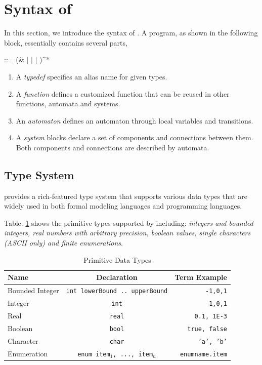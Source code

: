 \section{Syntax of \lang{}}
\label{sec:syntax}

In this section, we introduce the syntax of \lang{}. A \lang{} program, as shown in the following block, essentially contains several parts,
\begin{bnf}
     ::=  (&  |  |  | )^*
\end{bnf}

\begin{enumerate}
    \item A \emph{typedef} specifies an alias name for given types.
    \item A \emph{function} defines a customized function that can be reused in other functions, automata and systems.
    \item An \emph{automaton} defines an automaton through local variables and transitions.
    \item A \emph{system} blocks declare a set of components and connections between them. Both components and connections are described by automata.
\end{enumerate}

\subsection{Type System}
\label{subsec:typesystem}
\lang{} provides a rich-featured type system that supports various data types that are widely used in both formal modeling languages and programming languages.

 Table. \ref{table:primitivetypes} shows the primitive types supported by \lang{} including: \emph{ integers and bounded integers,  real numbers with arbitrary precision, boolean values, single characters (ASCII only) and finite enumerations}.

\begin{table}
    \caption{Primitive Data Types}
    \label{table:primitivetypes}
    \centering
    \begin{tabular}{lcr}
        \hline
        Name & Declaration & Term Example \T\B \\
        \hline
        \T Bounded Integer\hspace{0.5cm} & \texttt{int lowerBound .. upperBound}\hspace{0.5cm} & \texttt{-1,0,1} \\
        Integer & \texttt{int} & \texttt{-1,0,1} \\
        Real & \texttt{real} & \texttt{0.1, 1E-3} \\
        Boolean & \texttt{bool} & \texttt{true, false} \\
        Character & \texttt{char} & \texttt{'a', 'b'} \\
        \B Enumeration & \texttt{enum {item$_1$, ..., item$_n$}} & \texttt{enumname.item} \\
        \hline
    \end{tabular}
\end{table}

